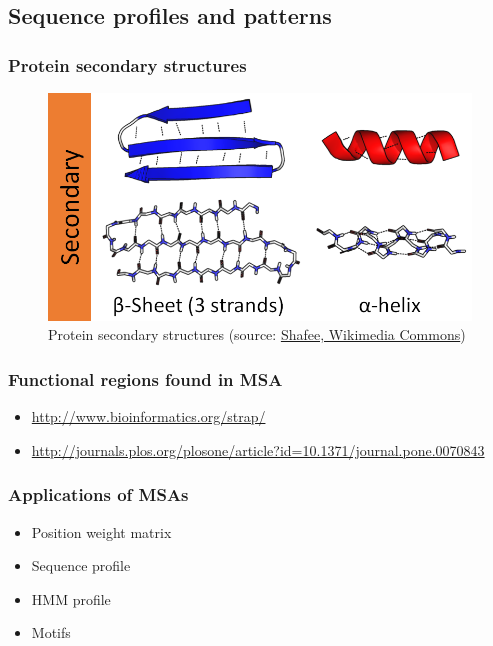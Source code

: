 %
%

%
%
\subsection{Sequence profiles and patterns}

%
%
\subsubsection*{Protein secondary structures}

\begin{figure}[H]
  \centering
      \includegraphics[width=0.5 \textwidth]{fig12/Alpha_beta_structure.png}
  \caption{Protein secondary structures (source: \href{https://commons.wikimedia.org/w/index.php?curid=56202452}{Shafee, Wikimedia Commons})}
\end{figure}

%
%
\subsubsection*{Functional regions found in MSA}

\begin{itemize}
\item \url{http://www.bioinformatics.org/strap/}
\item \url{http://journals.plos.org/plosone/article?id=10.1371/journal.pone.0070843}
\end{itemize}

%
%
\subsubsection*{Applications of MSAs}
\begin{itemize}
\item Position weight matrix
\item Sequence profile
\item HMM profile
\item Motifs
\end{itemize}

\bigskip 

%
